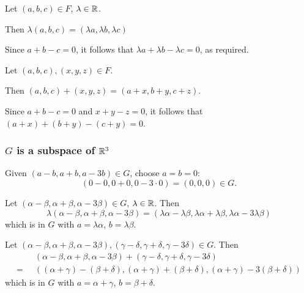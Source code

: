 \documentclass[11pt]{article}
\begin{document}
\begin{enumerate}

          Let $(a, b, c) \in F$, $\lambda \in \mathbb{R}$.

          Then $\lambda (a, b, c) = (\lambda a, \lambda b, \lambda c)$

          Since $a + b - c = 0$, it follows that $\lambda a + \lambda b - \lambda c = 0$, as required.


          Let $(a, b, c), (x, y, z) \in F$.

          Then $ (a, b, c) + (x, y, z) = (a + x, b + y, c + z) $.

          Since $a + b - c = 0$ and $x + y - z = 0$, it follows that $(a + x) + (b + y) - (c + y) = 0$.

          \subsubsection*{$G$ is a subspace of $\mathbb{R}^3$}


          Given $(a - b, a + b, a - 3b) \in G$, choose $a = b = 0$:
          \[
              (0 - 0, 0 + 0, 0 - 3 \cdot 0) = (0, 0, 0) \in G.
          \]


          Let $(\alpha - \beta, \alpha + \beta, \alpha - 3\beta) \in G$, $\lambda \in \mathbb{R}$.  Then
          \[
              \lambda (\alpha - \beta, \alpha + \beta, \alpha - 3\beta) = (\lambda \alpha - \lambda \beta, \lambda \alpha + \lambda \beta, \lambda \alpha - 3\lambda \beta)
          \]
          which is in $G$ with $a = \lambda \alpha$, $b = \lambda \beta$.


          Let $(\alpha - \beta, \alpha + \beta, \alpha - 3\beta), (\gamma - \delta, \gamma + \delta, \gamma - 3\delta) \in G$.  Then
          \[
              \begin{aligned}
                         & (\alpha - \beta, \alpha + \beta, \alpha - 3\beta) + (\gamma - \delta, \gamma + \delta, \gamma - 3\delta)            \\
                  = \;\; & ((\alpha + \gamma) - (\beta + \delta), (\alpha + \gamma) + (\beta + \delta), (\alpha + \gamma) - 3(\beta + \delta))
              \end{aligned}
          \]
          which is in $G$ with $a = \alpha + \gamma$, $b = \beta + \delta$.


\end{enumerate}
\end{document}
